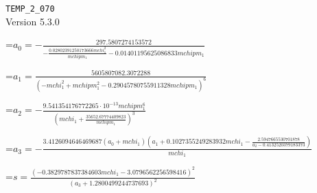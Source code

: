 \documentclass{article}
\newcommand{\exprline}[1]{\par\noindent\begingroup\setbox0=\hbox{$\displaystyle #1$}\ifdim\wd0>\linewidth\resizebox{\linewidth}{!}{\box0}\else\box0\fi\endgroup\par\medskip}
\begin{document}
\noindent\texttt{TEMP\_2\_070}\\
Version 5.3.0\\
\exprline{a_{0} = - \frac{297.5807274153572}{- \frac{0.02802391250173666 mchi_{1}^{2}}{mchipm_{1}} - 0.01401195625086833 mchipm_{1}}}
\exprline{a_{1} = \frac{5605807082.3072288}{\left(- mchi_{1}^{2} + mchipm_{1}^{2} - 0.29045780755911328 mchipm_{1}\right)^{6}}}
\exprline{a_{2} = - \frac{9.541354176772265 \cdot 10^{-13} mchipm_{1}^{6}}{\left(mchi_{1} + \frac{35652.67774409823}{mchipm_{1}}\right)^{3}}}
\exprline{a_{3} = - \frac{3.4126094646469687 \left(a_{0} + mchi_{1}\right) \left(a_{1} + 0.1027355249283932 mchi_{1} - \frac{2.5947665530701878}{a_{2} - 0.4132520379183373}\right)}{mchi_{1}}}
\exprline{s = \frac{\left(- 0.3829787837384603 mchi_{1} - 3.0796562256598416\right)^{2}}{\left(a_{3} + 1.2800499244737693\right)^{2}}}
\end{document}
